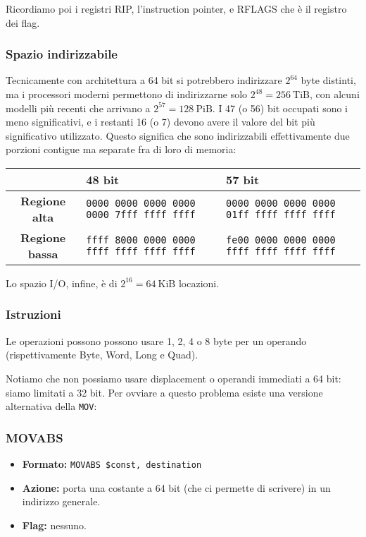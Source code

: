 \documentclass[a4paper,11pt]{article}
\begin{document}
Ricordiamo poi i registri RIP, l'instruction pointer, e RFLAGS che è il registro dei flag.

\subsubsection{Spazio indirizzabile}
Tecnicamente con architettura a 64 bit si potrebbero indirizzare $2^{64}$ byte distinti, ma i processori moderni permettono di indirizzarne solo $2^{48} = 256 \ \mathrm{TiB}$, con alcuni modelli più recenti che arrivano a $2^{57}= 128 \ \mathrm{PiB}$.
I 47 (o 56) bit occupati sono i meno significativi, e i restanti 16 (o 7) devono avere il valore del bit più significativo utilizzato.
Questo significa che sono indirizzabili effettivamente due porzioni contigue ma separate fra di loro di memoria:
\begin{table}[h!]
	\center {}
	\begin{tabular} { c | p{4cm} | p{4cm} }
		& \bfseries 48 bit & \bfseries 57 bit \\
		\hline
		\bfseries Regione alta & \texttt{0000 0000 0000 0000} \texttt{0000 7fff ffff ffff} & \texttt{0000 0000 0000 0000} \texttt{01ff ffff ffff ffff} \\
		\bfseries Regione bassa & \texttt{ffff 8000 0000 0000} \texttt{ffff ffff ffff ffff} & \texttt{fe00 0000 0000 0000} \texttt{ffff ffff ffff ffff} \\
	\end{tabular}
\end{table}

Lo spazio I/O, infine, è di $2^{16} = 64 \ \mathrm{KiB}$ locazioni.

\subsubsection{Istruzioni}
Le operazioni possono possono usare 1, 2, 4 o 8 byte per un operando (rispettivamente Byte, Word, Long e Quad).

Notiamo che non possiamo usare displacement o operandi immediati a 64 bit: siamo limitati a 32 bit.
Per ovviare a questo problema esiste una versione alternativa della \lstinline|MOV|:

\subsubsection{MOVABS}
\begin{itemize}
	\item \textbf{Formato:} \lstinline|MOVABS $const, destination|
	\item \textbf{Azione:} porta una costante a 64 bit (che ci permette di scrivere) in un indirizzo generale.
	\item \textbf{Flag:} nessuno.
\end{itemize}
\end{document}
